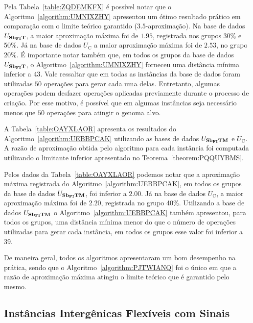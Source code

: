 Pela Tabela~\ref{table:ZQDEMKFX} é possível notar que o Algoritmo~\ref{algorithm:UMNIXZHY} apresentou um ótimo resultado prático em comparação com o limite teórico garantido ($3.5$-aproximação). Na base de dados $U_{\textbf{Sb\textsubscript{FI}T}}{}$, a maior aproximação máxima foi de $1.95$, registrada nos grupos 30\% e 50\%. Já na base de dados $U_{\text{C}}$ a maior aproximação máxima foi de $2.53$, no grupo 20\%. É importante notar também que, em todos os grupos da base de dados $U_{\textbf{Sb\textsubscript{FI}T}}{}$, o Algoritmo~\ref{algorithm:UMNIXZHY} forneceu uma distância mínima inferior a $43$. Vale ressaltar que em todas as instâncias da base de dados foram utilizadas $50$ operações para gerar cada uma delas. Entretanto, algumas operações podem desfazer operações aplicadas previamente durante o processo de criação. Por esse motivo, é possível que em algumas instâncias seja necessário menos que $50$ operações para atingir o genoma alvo.

A Tabela~\ref{table:OAYXLAOR} apresenta os resultados do Algoritmo~\ref{algorithm:UEBBPCAK} utilizando as bases de dados $U_{\textbf{Sb\textsubscript{FI}TM}}{}$ e $U_{\text{C}}$. A razão de aproximação obtida pelo algoritmo para cada instância foi computada utilizando o limitante inferior apresentado no Teorema~\ref{theorem:PQQUYBMS}.



Pelos dados da Tabela~\ref{table:OAYXLAOR} podemos notar que a aproximação máxima registrada do Algoritmo~\ref{algorithm:UEBBPCAK}, em todos os grupos da base de dados $U_{\textbf{Sb\textsubscript{FI}TM}}{}$, foi inferior a $2.00$. Já na base de dados $U_{\text{C}}$, a maior aproximação máxima foi de $2.20$, registrada no grupo 40\%. Utilizando a base de dados $U_{\textbf{Sb\textsubscript{FI}TM}}{}$ o Algoritmo~\ref{algorithm:UEBBPCAK} também apresentou, para todos os grupos, uma distância mínima menor do que o número de operações utilizadas para gerar cada instância, em todos os grupos esse valor foi inferior a $39$.

De maneira geral, todos os algoritmos apresentaram um bom desempenho na prática, sendo que o Algoritmo~\ref{algorithm:PJTWIANQ} foi o único em que a razão de aproximação máxima atingiu o limite teórico que é garantido pelo mesmo. 

\subsection{Instâncias Intergênicas Flexíveis com Sinais}

